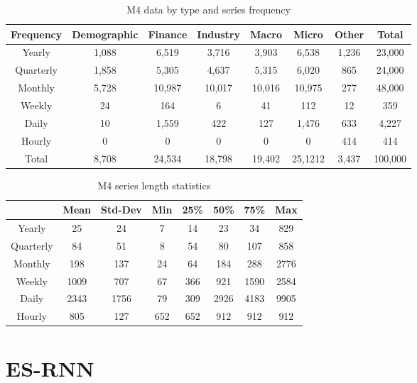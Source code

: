 \documentclass{article}
\begin{document}
\begin{table}[!ht]
	\centering
  	\begin{tabular}{cccccccc} \toprule
		\textbf{Frequency} & \textbf{Demographic} & \textbf{Finance} & \textbf{Industry} & \textbf{Macro} & \textbf{Micro} & \textbf{Other} & \textbf{Total}  \\ \midrule
		Yearly & 1,088 & 6,519 & 3,716 & 3,903 & 6,538 & 1,236 & 23,000 \\
		\midrule
		Quarterly & 1,858 & 5,305 & 4,637 & 5,315 & 6,020 & 865 & 24,000 \\
		\midrule
		Monthly & 5,728 & 10,987 & 10,017 & 10,016 & 10,975 & 277 & 48,000 \\
		\midrule		
		Weekly & 24 & 164 & 6 & 41 & 112 & 12 & 359 \\
		\midrule		
		Daily & 10 & 1,559 & 422 & 127 & 1,476 & 633 & 4,227 \\
		\midrule		
		Hourly & 0 & 0 & 0 & 0 & 0 & 414 & 414 \\
		\midrule		
		Total & 8,708 & 24,534 & 18,798 & 19,402 & 25,1212 & 3,437 & 100,000 \\
		 \bottomrule
	\end{tabular}
	\caption{M4 data by type and series frequency}
	\label{tab:dsstats}
\end{table}

\begin{table}[!ht]
	\centering
  	\begin{tabular}{cccccccc} 
		\toprule
			& \textbf{Mean} & \textbf{Std-Dev} & \textbf{Min} & \textbf{25\%} & \textbf{50\%} & \textbf{75\%} & \textbf{Max}  \\ 
		\midrule
		Yearly & 25 & 24 & 7 & 14 & 23 & 34 & 829 \\
		\midrule
		Quarterly & 84 & 51 & 8 & 54 & 80 & 107 & 858 \\
		\midrule
		Monthly & 198 & 137 & 24 & 64 & 184 & 288 & 2776 \\
		\midrule		
		Weekly & 1009 & 707 & 67 & 366 & 921 & 1590 & 2584 \\
		\midrule		
		Daily & 2343 & 1756 & 79 & 309 & 2926 & 4183 & 9905 \\
		\midrule		
		Hourly & 805 & 127 & 652 & 652 & 912 & 912 & 912 \\
    	       \bottomrule
	\end{tabular}
	\caption{M4 series length statistics}
	\label{tab:dslengthstats}
\end{table}


\section{ES-RNN}
\label{ESRNN}
\end{document}
